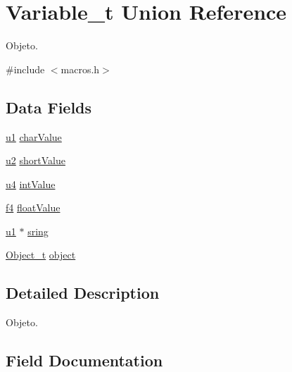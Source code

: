 \hypertarget{union_variable__t}{}\section{Variable\+\_\+t Union Reference}
\label{union_variable__t}


Objeto.  




{\ttfamily \#include $<$macros.\+h$>$}

\subsection*{Data Fields}
\begin{DoxyCompactItemize}
\item 
\hyperlink{macros_8h_ad9f4cdb6757615aae2fad89dab3c5470}{u1} \hyperlink{union_variable__t_aba1116ae1f14241d7f7dedfa4274fd03}{char\+Value}
\item 
\hyperlink{macros_8h_a732cde1300aafb73b0ea6c2558a7a54f}{u2} \hyperlink{union_variable__t_a9632f6ba24dab2f6881c6edd5cb62db5}{short\+Value}
\item 
\hyperlink{macros_8h_ae5be1f726785414dd1b77d60df074c9d}{u4} \hyperlink{union_variable__t_a7dc20c56214fe63b7a0832e3a37a8cc3}{int\+Value}
\item 
\hyperlink{macros_8h_a246dd6395edc3543fabd2b352f276f3e}{f4} \hyperlink{union_variable__t_ac559cbc67446421d60b499bf7951d951}{float\+Value}
\item 
\hyperlink{macros_8h_ad9f4cdb6757615aae2fad89dab3c5470}{u1} $\ast$ \hyperlink{union_variable__t_a0c54d8fa8486a6551157f1a462848982}{sring}
\item 
\hyperlink{struct_object__t}{Object\+\_\+t} \hyperlink{union_variable__t_a25c42d64ee27e6039892e1b101ee83d9}{object}
\end{DoxyCompactItemize}


\subsection{Detailed Description}
Objeto. 

\subsection{Field Documentation}
\hypertarget{union_variable__t_aba1116ae1f14241d7f7dedfa4274fd03}{}
